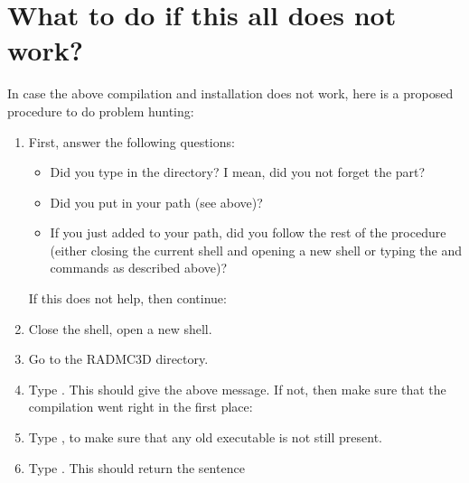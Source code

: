 \documentclass[letterpaper,10pt,english]{sphinxmanual}
\begin{document}
\section{What to do if this all does not work?}
\label{\detokenize{installation:what-to-do-if-this-all-does-not-work}}
In case the above compilation and installation does not work, here is a
proposed procedure to do problem hunting:
\begin{enumerate}
%
\item {} 
First, answer the following questions:
\begin{itemize}
\item {} 
Did you type  in the 
directory? I mean, did you not forget the  part?

\item {} 
Did you put  in your path (see above)?

\item {} 
If you just added  to your path, did you
follow the rest of the procedure (either closing the current shell and
opening a new shell or typing the  and  commands as
described above)?

\end{itemize}

If this does not help, then continue:

\item {} 
Close the shell, open a new shell.

\item {} 
Go to the RADMC\sphinxhyphen{}3D  directory.

\item {} 
Type . This should give the above message. If
not, then make sure that the compilation went right in the first place:

\item {} 
Type , to make sure that any old executable
is not still present.

\item {} 
Type . This should return the sentence


\end{enumerate}
\end{document}
